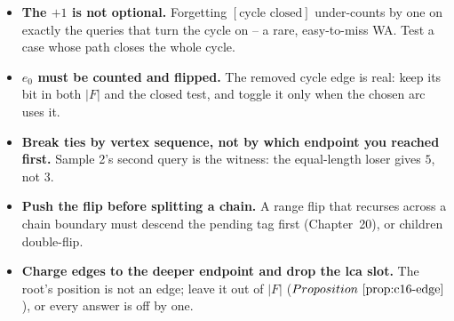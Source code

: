 
\begin{hardeningbox}
\begin{itemize}[nosep,leftmargin=1.4em]
  \item \textbf{The \(+1\) is not optional.} Forgetting \([\text{cycle closed}]\) under-counts by
        one on exactly the queries that turn the cycle on -- a rare, easy-to-miss WA. Test a case
        whose path closes the whole cycle.
  \item \textbf{\(e_0\) must be counted and flipped.} The removed cycle edge is real: keep its bit
        in both \(|F|\) and the closed test, and toggle it only when the chosen arc uses it.
  \item \textbf{Break ties by vertex sequence, not by which endpoint you reached first.} Sample
        2's second query is the witness: the equal-length loser gives \(5\), not \(3\).
  \item \textbf{Push the flip before splitting a chain.} A range flip that recurses across a chain
        boundary must descend the pending tag first (Chapter~20), or children double-flip.
  \item \textbf{Charge edges to the deeper endpoint and drop the lca slot.} The root's position is
        not an edge; leave it out of \(|F|\) (\(\propref{c16-edge}\)), or every answer is off by one.
\end{itemize}
\end{hardeningbox}

